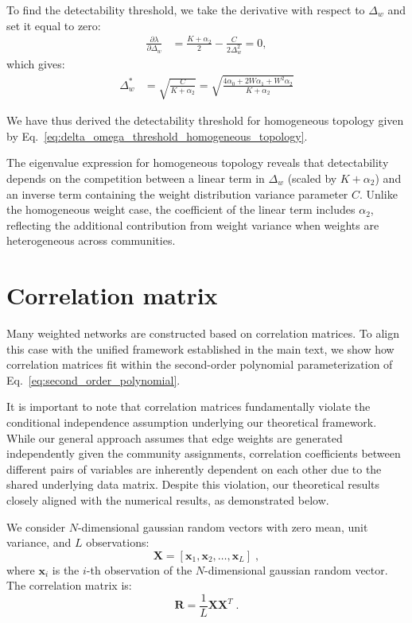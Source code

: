 \documentclass[a4paper,pre,superscriptaddress,floatfix,nofootinbib,twocolumn]{revtex4-1}
\begin{document}
To find the detectability threshold, we take the derivative with respect to $\Delta_{w}$ and set it equal to zero:
\begin{align*}
\frac{\partial \lambda}{\partial \Delta_{w}} &= \frac{K + \alpha_2}{2} - \frac{C}{2\Delta_{w}^2} = 0,
\end{align*}
which gives:
\begin{align*}
\Delta_{w}^* &= \sqrt{\frac{C}{K + \alpha_2}} = \sqrt{\frac{4\alpha_0 + 2W\alpha_1 + W^2\alpha_2}{K + \alpha_2}}
\end{align*}

We have thus derived the detectability threshold for homogeneous topology given by Eq.~\eqref{eq:delta_omega_threshold_homogeneous_topology}.

The eigenvalue expression for homogeneous topology reveals that detectability depends on the competition between a linear term in $\Delta_{w}$ (scaled by $K + \alpha_2$) and an inverse term containing the weight distribution variance parameter $C$. Unlike the homogeneous weight case, the coefficient of the linear term includes $\alpha_2$, reflecting the additional contribution from weight variance when weights are heterogeneous across communities.


\section{Correlation matrix}
\label{sec:correlation_matrix}

Many weighted networks are constructed based on correlation matrices. To align this case with the unified framework established in the main text, we show how correlation matrices fit within the second-order polynomial parameterization of Eq.~\eqref{eq:second_order_polynomial}.

It is important to note that correlation matrices fundamentally violate the conditional independence assumption underlying our theoretical framework. While our general approach assumes that edge weights are generated independently given the community assignments, correlation coefficients between different pairs of variables are inherently dependent on each other due to the shared underlying data matrix. Despite this violation, our theoretical results closely aligned with the numerical results, as demonstrated below.

We consider $N$-dimensional gaussian random vectors with zero mean, unit variance, and $L$ observations:
\begin{equation}
\mathbf{X} = \left[ \mathbf{x}_1, \mathbf{x}_2, \ldots, \mathbf{x}_L \right] \; ,
\end{equation}
where $\mathbf{x}_i$ is the $i$-th observation of the $N$-dimensional gaussian random vector. The correlation matrix is:
\begin{equation}
    \mathbf{R} = \frac{1}{L} \mathbf{X} \mathbf{X}^T \; .
\end{equation}
\end{document}
